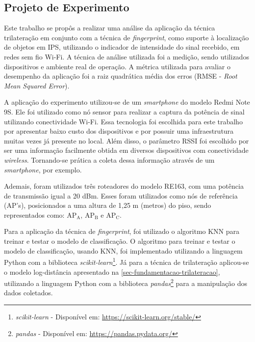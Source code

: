 \documentclass[12pt]{artigoifce}
\begin{document}

\subsection{Projeto de Experimento}
\label{sec-metodogolia-experimento}

Este trabalho se propôs a realizar uma análise da aplicação da técnica trilateração em conjunto com a técnica de \textit{fingerprint}, como suporte à localização de objetos em IPS, utilizando o indicador de intensidade do sinal recebido, em redes sem fio Wi-Fi. A técnica de análise utilizada foi a medição, sendo utilizados dispositivos e ambiente real de operação. A métrica utilizada para avaliar o desempenho da aplicação foi a raiz quadrática média dos erros (RMSE - \textit{Root Mean Squared Error}).

A aplicação do experimento utilizou-se de um \textit{smartphone} do modelo Redmi Note 9S. Ele foi utilizado como nó sensor para realizar a captura da potência de sinal utilizando conectividade Wi-Fi. Essa tecnologia foi escolhida para este trabalho por apresentar baixo custo dos dispositivos e por possuir uma infraestrutura muitas vezes já presente no local. Além disso, o parâmetro RSSI foi escolhido por ser uma informação facilmente obtida em diversos  dispositivos com conectividade \textit{wireless}. Tornando-se prática a coleta dessa informação através de um \textit{smartphone}, por exemplo.

Ademais, foram utilizados três roteadores do modelo RE163, com uma potência de transmissão igual a 20 dBm. Esses foram utilizados como nós de referência (AP's), posicionados a uma altura de 1,25 m (metros) do piso, sendo representados como: AP$_\text{A}$, AP$_\text{B}$ e AP$_\text{C}$.

Para a aplicação da técnica de \textit{fingerprint}, foi utilizado o algoritmo KNN para treinar e testar o modelo de classificação. O algoritmo para treinar e testar o modelo de classificação, usando KNN, foi implementado utilizando a linguagem Python com a biblioteca \textit{scikit-learn}\footnote{\textit{scikit-learn} - Disponível em: \url{https://scikit-learn.org/stable/}}. Já para a técnica de trilateração aplicou-se o modelo log-distância apresentado na \autoref{sec-fundamentacao-trilateracao}, utilizando a linguagem Python com a biblioteca \textit{pandas}\footnote{\textit{pandas} - Disponível em: \url{https://pandas.pydata.org/}} para a manipulação dos dados coletados.
\end{document}
